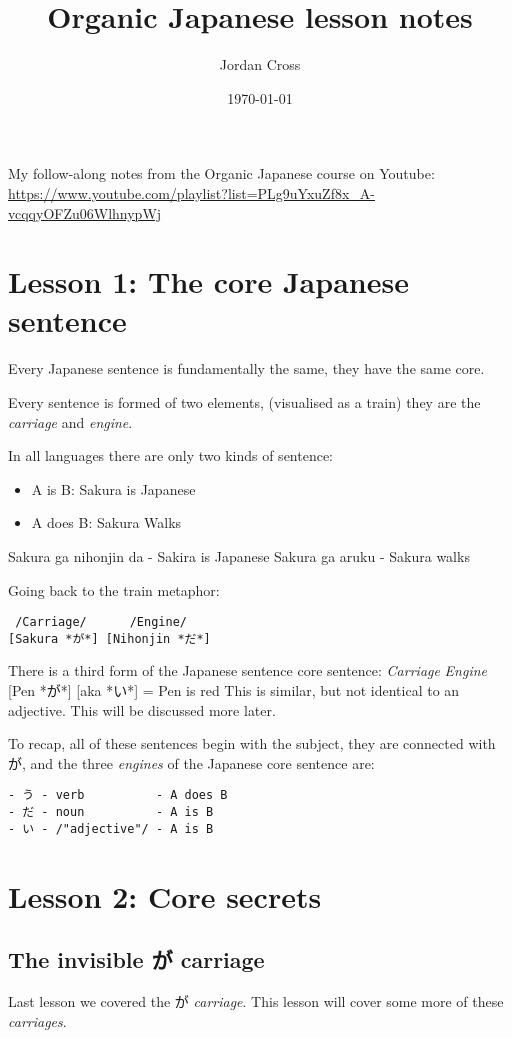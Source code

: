 \documentclass[11pt]{article}
\author{Jordan Cross}
\date{\today}
\title{Organic Japanese lesson notes}
\begin{document}
\maketitle
\tableofcontents

My follow-along notes from the Organic Japanese course on Youtube: \url{https://www.youtube.com/playlist?list=PLg9uYxuZf8x\_A-vcqqyOFZu06WlhnypWj}

\section{Lesson 1: The core Japanese sentence}
\label{sec:org10e7b65}
Every Japanese sentence is fundamentally the same, they have the same core.

Every sentence is formed of two elements, (visualised as a train) they are the \emph{carriage} and \emph{engine}.

In all languages there are only two kinds of sentence:
\begin{itemize}
\item A is B: Sakura is Japanese
\item A does B: Sakura Walks
\end{itemize}

Sakura ga nihonjin da - Sakira is Japanese
Sakura ga aruku - Sakura walks

Going back to the train metaphor:
\begin{verbatim}
 /Carriage/      /Engine/
[Sakura *が*] [Nihonjin *だ*]
\end{verbatim}

There is a third form of the Japanese sentence core sentence:
\emph{Carriage}  \emph{Engine}
[Pen *が*] [aka *い*] = Pen is red
This is similar, but not identical to an adjective. This will be discussed more later.

To recap, all of these sentences begin with the subject, they are connected with が, and the three \emph{engines} of the Japanese core sentence are:
\begin{verbatim}
- う - verb          - A does B
- だ - noun          - A is B
- い - /"adjective"/ - A is B
\end{verbatim}

\section{Lesson 2: Core secrets}
\label{sec:orgbcfa4c4}
\subsection{The invisible が carriage}
\label{sec:orgcdd8366}
Last lesson we covered the が \emph{carriage}. This lesson will cover some more of these \emph{carriages}.
\end{document}
